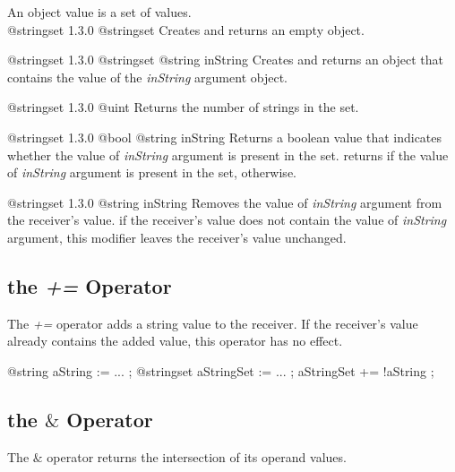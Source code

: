 

An  object value is a set of  values.\\


{@stringset}
{1.3.0}
{@stringset}
{Creates and returns an empty  object.}
{}

{@stringset}
{1.3.0}
{@stringset}
{@string inString}
{Creates and returns an  object that contains the value of the \emph{inString} argument object.}
{}


{@stringset}
{1.3.0}
{@uint}
{Returns the number of strings in the set.}
{}



{@stringset}
{1.3.0}
{@bool}
{@string inString}
{Returns a boolean value that indicates whether the value of \emph{inString} argument is present in the set.}
{returns  if the value of \emph{inString} argument is present in the set,  otherwise.}




{@stringset}
{1.3.0}
{@string inString}
{Removes the value of \emph{inString} argument from the receiver's value.}
{if the receiver's value does not contain the value of \emph{inString} argument, this modifier leaves the receiver's value unchanged.}






\subsection{the \emph{+=} Operator}

The \emph{+=} operator adds a string value to the receiver. If the receiver's value already contains the added value, this operator has no effect.

\exempleTroisLignes
{}
{@string aString := ... ;}
{@stringset aStringSet := ... ;}
{aStringSet += !aString ;}




\subsection{the \emph{$\&$} Operator}

The \emph{$\&$} operator returns the intersection of its operand values.

